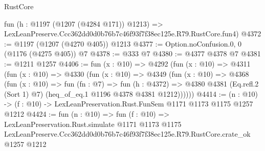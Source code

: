 \begin{lexlean}{RustCore}
\begin{coremodule}
    fun (h : @1197 (@1207 (@4284 @171)) @1213) =>
    LexLeanPreserve.Ccc362dd0d0b76b7c46f93f7f38ec125e.R79.RustCore.fun4)
@4372 := @1197 (@1207 (@4270 @405)) @1213
@4377 := Option.noConfusion.{0, 0} (@1176 (@4275 @405)) @7
@4378 := @333 @7
@4380 := @4377 @4378 @7
@4381 := @1211 @1257
@4406 := fun (x : @10) =>
  @4292
    (fun (x : @10) =>
    @4311
      (fun (x : @10) =>
      @4330
        (fun (x : @10) =>
        @4349
          (fun (x : @10) =>
          @4368
            (fun (x : @10) =>
            fun (fn : @7) =>
            fun (h : @4372) =>
            @4380 @4381 (Eq.refl.{2} (Sort 1) @7) (heq_of_eq.{1} @1196 @4378 @4381 @1212))))))
@4414 := (n : @10) -> (f : @10) -> LexLeanPreservation.Rust.FunSem @1171 @1173 @1175 @1257 @1212
@4424 := fun (n : @10) =>
  fun (f : @10) =>
  LexLeanPreservation.Rust.simulate
    @1171
    @1173
    @1175
    LexLeanPreserve.Ccc362dd0d0b76b7c46f93f7f38ec125e.R79.RustCore.crate_ok
    @1257
    @1212
\end{coremodule}
\end{lexlean}
